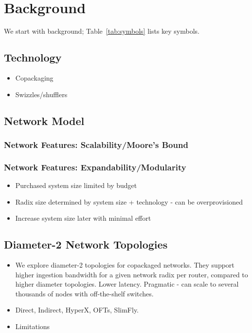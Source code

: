\section{Background}
\label{sec:back}

We start with background; Table~\ref{tab:symbols} lists 
key symbols. 

\subsection{Technology}
    \begin{itemize}
        \item Copackaging
        \item Swizzles/shufflers
    \end{itemize}

\subsection{Network Model}

\subsubsection{Network Features: Scalability/Moore's Bound}

\subsubsection{Network Features: Expandability/Modularity}
    \begin{itemize}
        \item Purchased system size limited by budget

        \item Radix size determined by system size + technology - can be overprovisioned

        \item Increase system size later with minimal effort
    \end{itemize}

\subsection{Diameter-2 Network Topologies}
    \begin{itemize}
        \item We explore diameter-2 topologies for copackaged networks.
        They support higher ingestion bandwidth for a given network 
        radix per router, compared to higher diameter topologies.
        Lower latency. Pragmatic - can scale to several thousands of nodes with
        off-the-shelf switches. 
    
        \item Direct, Indirect, HyperX, OFTs, SlimFly.

        \item Limitations
    \end{itemize}
